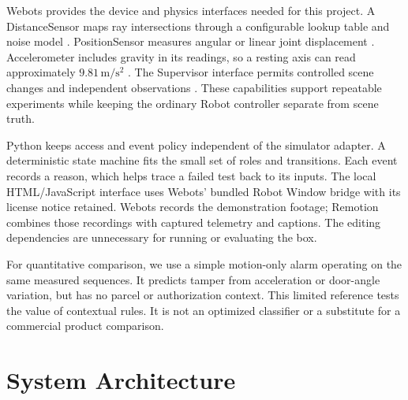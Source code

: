 \documentclass[conference,letterpaper]{IEEEtran}
\begin{document}
Webots provides the device and physics interfaces needed for this project. A DistanceSensor maps ray intersections through a configurable lookup table and noise model \cite{distance}. PositionSensor measures angular or linear joint displacement \cite{position}. Accelerometer includes gravity in its readings, so a resting axis can read approximately $9.81\,\mathrm{m/s^2}$ \cite{acceleration}. The Supervisor interface permits controlled scene changes and independent observations \cite{supervisor}. These capabilities support repeatable experiments while keeping the ordinary Robot controller separate from scene truth.

Python keeps access and event policy independent of the simulator adapter. A deterministic state machine fits the small set of roles and transitions. Each event records a reason, which helps trace a failed test back to its inputs. The local HTML/JavaScript interface uses Webots' bundled Robot Window bridge with its license notice retained. Webots records the demonstration footage; Remotion combines those recordings with captured telemetry and captions. The editing dependencies are unnecessary for running or evaluating the box.

For quantitative comparison, we use a simple motion-only alarm operating on the same measured sequences. It predicts tamper from acceleration or door-angle variation, but has no parcel or authorization context. This limited reference tests the value of contextual rules. It is not an optimized classifier or a substitute for a commercial product comparison.

\section{System Architecture}
\label{sec:architecture}
\end{document}
